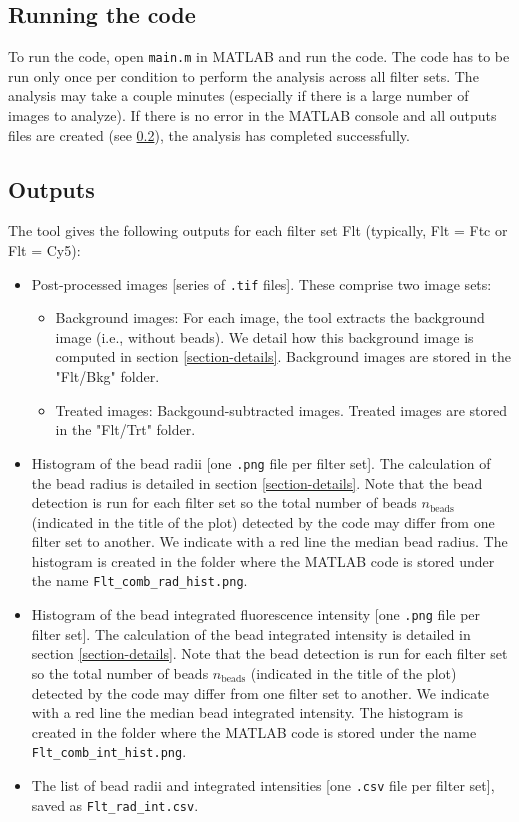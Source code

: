 \documentclass[a4paper]{article}
\begin{document}
\subsection{Running the code}
To run the code, open \verb|main.m| in MATLAB and run the code. The code has to be run only once per condition to perform the analysis across all filter sets. The analysis may take a couple minutes (especially if there is a large number of images to analyze). If there is no error in the MATLAB console and all outputs files are created (see \ref{section-outputs}), the analysis has completed successfully.


\subsection{Outputs}
\label{section-outputs}
The tool gives the following outputs for each filter set Flt (typically, Flt = Ftc or Flt = Cy5):

\begin{itemize}
    \item Post-processed images [series of \verb|.tif| files]. These comprise two image sets:
    \begin{itemize}
        \item Background images: For each image, the tool extracts the background image (i.e., without beads). We detail how this background image is computed in section \ref{section-details}. Background images are stored in the "Flt/Bkg" folder.
        \item Treated images: Backgound-subtracted images. Treated images are stored in the "Flt/Trt" folder.
    \end{itemize}

    \item Histogram of the bead radii [one \verb|.png| file per filter set]. The calculation of the bead radius is detailed in section \ref{section-details}. Note that the bead detection is run for each filter set so the total number of beads $n_{\text{beads}}$ (indicated in the title of the plot) detected by the code may differ from one filter set to another. We indicate with a red line the median bead radius. The histogram is created in the folder where the MATLAB code is stored under the name \verb|Flt_comb_rad_hist.png|.
    \item Histogram of the bead integrated fluorescence intensity [one \verb|.png| file per filter set]. The calculation of the bead integrated intensity is detailed in section \ref{section-details}. Note that the bead detection is run for each filter set so the total number of beads $n_{\text{beads}}$ (indicated in the title of the plot) detected by the code may differ from one filter set to another. We indicate with a red line the median bead integrated intensity. The histogram is created in the folder where the MATLAB code is stored under the name \verb|Flt_comb_int_hist.png|.
    \item The list of bead radii and integrated intensities [one \verb|.csv| file per filter set], saved as \verb|Flt_rad_int.csv|.
\end{itemize}
\end{document}
